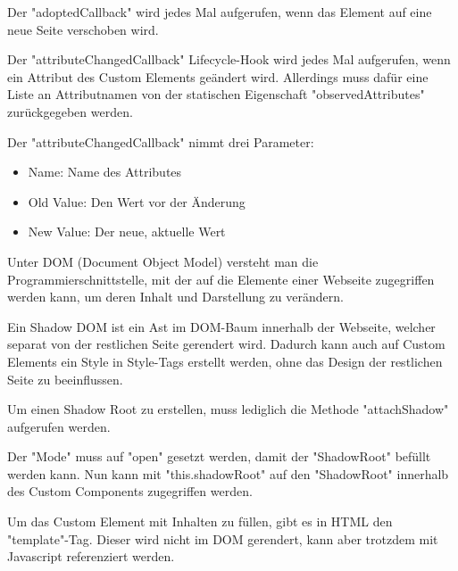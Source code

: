 
Der "adoptedCallback" wird jedes Mal aufgerufen, wenn das Element auf eine neue Seite verschoben wird.


Der "attributeChangedCallback" Lifecycle-Hook wird jedes Mal aufgerufen, wenn ein Attribut des Custom Elements geändert wird. Allerdings muss dafür eine Liste an Attributnamen von der statischen Eigenschaft "observedAttributes" zurückgegeben werden. 
    
Der "attributeChangedCallback" nimmt drei Parameter:
\begin{itemize}
    \item Name: Name des Attributes
    \item Old Value: Den Wert vor der Änderung
    \item New Value: Der neue, aktuelle Wert 
\end{itemize}


\pagebreak
{}

Unter DOM (Document Object Model) versteht man die Programmierschnittstelle, mit der auf die Elemente einer Webseite zugegriffen werden kann, um deren Inhalt und Darstellung zu verändern. \cite{MDNDOM}

Ein Shadow DOM ist ein Ast im DOM-Baum innerhalb der Webseite, welcher separat von der restlichen Seite gerendert wird. Dadurch kann auch auf Custom Elements ein Style in Style-Tags erstellt werden, ohne das Design der restlichen Seite zu beeinflussen. \cite{MDNShadowRoot}

Um einen Shadow Root zu erstellen, muss lediglich die Methode "attachShadow" aufgerufen werden. \cite{MDNShadowRoot}


Der "Mode" muss auf "open" gesetzt werden, damit der "ShadowRoot" befüllt werden kann. Nun kann mit "this.shadowRoot" auf den "ShadowRoot" innerhalb des Custom Components zugegriffen werden.
\cite{MDNShadowRoot}

\pagebreak
{}

Um das Custom Element mit Inhalten zu füllen, gibt es in HTML den "template"-Tag. Dieser wird nicht im DOM gerendert, kann aber trotzdem mit Javascript referenziert werden. \cite{MDNtemplate}

